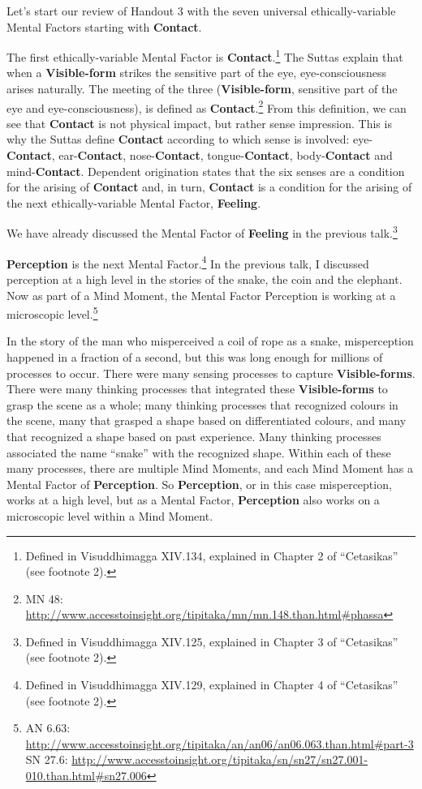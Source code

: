 Let’s start our review of Handout 3 with the seven universal ethically-variable Mental Factors starting with \textbf{Contact}.

The first ethically-variable Mental Factor is \textbf{Contact}.\footnote{Defined in Visuddhimagga XIV.134, explained in Chapter 2 of “Cetasikas” (see footnote 2).} The Suttas explain that when a \textbf{Visible-form} strikes the sensitive part of the eye, eye-consciousness arises naturally. The meeting of the three (\textbf{Visible-form}, sensitive part of the eye and eye-consciousness), is defined as \textbf{Contact}.\footnote{MN 48: \url{http://www.accesstoinsight.org/tipitaka/mn/mn.148.than.html\#phassa}} From this definition, we can see that \textbf{Contact} is not physical impact, but rather sense impression. This is why the Suttas define \textbf{Contact} according to which sense is involved: eye-\textbf{Contact}, ear-\textbf{Contact}, nose-\textbf{Contact}, tongue-\textbf{Contact}, body-\textbf{Contact} and mind-\textbf{Contact}. Dependent origination states that the six senses are a condition for the arising of \textbf{Contact} and, in turn, \textbf{Contact} is a condition for the arising of the next ethically-variable Mental Factor, \textbf{Feeling}.

We have already discussed the Mental Factor of \textbf{Feeling} in the previous talk.\footnote{Defined in Visuddhimagga XIV.125, explained in Chapter 3 of “Cetasikas” (see footnote 2).}

\textbf{Perception} is the next Mental Factor.\footnote{Defined in Visuddhimagga XIV.129, explained in Chapter 4 of “Cetasikas” (see footnote 2).} In the previous talk, I discussed perception at a high level in the stories of the snake, the coin and the elephant. Now as part of a Mind Moment, the Mental Factor Perception is working at a microscopic level.\footnote{AN 6.63: \url{http://www.accesstoinsight.org/tipitaka/an/an06/an06.063.than.html\#part-3}\\SN 27.6: \url{http://www.accesstoinsight.org/tipitaka/sn/sn27/sn27.001-010.than.html\#sn27.006}}

In the story of the man who misperceived a coil of rope as a snake, misperception happened in a fraction of a second, but this was long enough for millions of processes to occur. There were many sensing processes to capture \textbf{Visible-forms}. There were many thinking processes that integrated these \textbf{Visible-forms} to grasp the scene as a whole; many thinking processes that recognized colours in the scene, many that grasped a shape based on differentiated colours, and many that recognized a shape based on past experience. Many thinking processes associated the name “snake” with the recognized shape. Within each of these many processes, there are multiple Mind Moments, and each Mind Moment has a Mental Factor of \textbf{Perception}. So \textbf{Perception}, or in this case misperception, works at a high level, but as a Mental Factor, \textbf{Perception} also works on a microscopic level within a Mind Moment.

